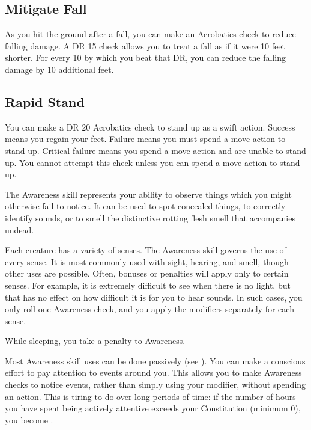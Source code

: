     \subsection{Mitigate Fall}
        As you hit the ground after a fall, you can make an Acrobatics check to reduce falling damage.
        A DR 15 check allows you to treat a fall as if it were 10 feet shorter.
        For every 10 by which you beat that DR, you can reduce the falling damage by 10 additional feet.

    \subsection{Rapid Stand}
        You can make a DR 20 Acrobatics check to stand up as a swift action.
        Success means you regain your feet.
        Failure means you must spend a move action to stand up.
        Critical failure means you spend a move action and are unable to stand up.
        You cannot attempt this check unless you can spend a move action to stand up.

    The Awareness skill represents your ability to observe things which you might otherwise fail to notice. It can be used to spot concealed things, to correctly identify sounds, or to smell the distinctive rotting flesh smell that accompanies undead.

    Each creature has a variety of senses. The Awareness skill governs the use of every sense. It is most commonly used with sight, hearing, and smell, though other uses are possible. Often, bonuses or penalties will apply only to certain senses. For example, it is extremely difficult to see when there is no light, but that has no effect on how difficult it is for you to hear sounds. In such cases, you only roll one Awareness check, and you apply the modifiers separately for each sense.

    While sleeping, you take a  penalty to Awareness.

    \label{Awareness-Passive and Active Attention}
    Most Awareness skill uses can be done passively (see ).
    You can make a conscious effort to pay attention to events around you. This allows you to make Awareness checks to notice events, rather than simply using your modifier, without spending an action. This is tiring to do over long periods of time: if the number of hours you have spent being actively attentive exceeds your Constitution (minimum 0), you become \fatigued.


